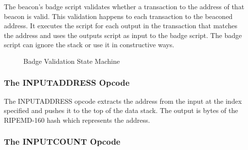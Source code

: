 \documentclass{article}
\begin{document}
The beacon's badge script validates whether a transaction to the address of that
beacon is valid. This validation happens to each transaction to the beaconed address.
It executes the script for each output in the transaction that matches the address
and uses the outputs script as input to the badge script. The badge script can
ignore the stack or use it in constructive ways.

\begin{figure}[H]
    \begin{center}
    \end{center}
    \caption{Badge Validation State Machine}
\end{figure}

\subsubsection{The INPUTADDRESS Opcode}

\begin{center}
\end{center}

The INPUTADDRESS \gls{opcode} extracts the address from the input at the index specified
and pushes it to the top of the data stack. The output is bytes of the RIPEMD-160
hash which represents the address.

\subsubsection{The INPUTCOUNT Opcode}
\end{document}
